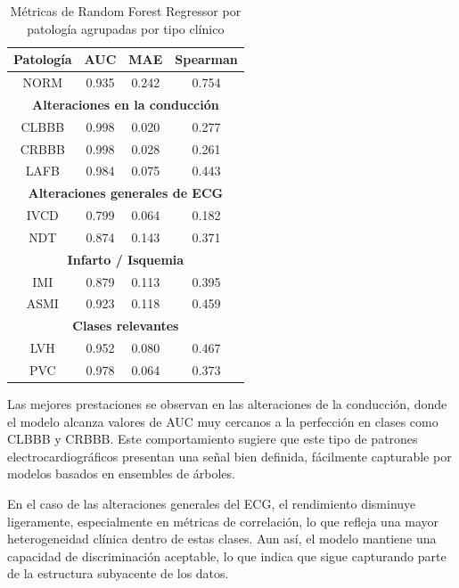 \documentclass[12pt,a4paper,twoside]{book}
\begin{document}
\begin{table}[H]
	\centering
	\begin{tabular}{|c|c|c|c|}
	\hline

	\textbf{Patología} & \textbf{AUC} & \textbf{MAE} & \textbf{Spearman} \\
	\hline
	NORM & 0.935 & 0.242 & 0.754 \\
	\hline

	\multicolumn{4}{|c|}{\textbf{Alteraciones en la conducción}} \\
	\hline
	CLBBB & 0.998 & 0.020 & 0.277 \\
	CRBBB & 0.998 & 0.028 & 0.261 \\
	LAFB  & 0.984 & 0.075 & 0.443 \\
	\hline

	\multicolumn{4}{|c|}{\textbf{Alteraciones generales de ECG}} \\
	\hline
	IVCD & 0.799 & 0.064 & 0.182 \\ 
	NDT  & 0.874 & 0.143 & 0.371 \\
	\hline

	\multicolumn{4}{|c|}{\textbf{Infarto / Isquemia}} \\
	\hline
	IMI  & 0.879 & 0.113 & 0.395 \\ 
	ASMI & 0.923 & 0.118 & 0.459 \\
	\hline


	\multicolumn{4}{|c|}{\textbf{Clases relevantes}} \\
	\hline
	LVH & 0.952 & 0.080 & 0.467 \\ 
	PVC & 0.978 & 0.064 & 0.373 \\
	\hline

	\end{tabular}
	\caption{Métricas de Random Forest Regressor por patología agrupadas por tipo clínico}
	\label{tab:metrics_grouped_rfr}
\end{table}

Las mejores prestaciones se observan en las alteraciones de la conducción, donde el modelo alcanza valores de AUC muy cercanos a la perfección en clases como CLBBB y CRBBB. 
Este comportamiento sugiere que este tipo de patrones electrocardiográficos presentan una señal bien definida, fácilmente capturable por modelos basados en ensembles de árboles.

En el caso de las alteraciones generales del ECG, el rendimiento disminuye ligeramente, especialmente en métricas de correlación, lo que refleja una mayor heterogeneidad clínica dentro de estas clases. 
Aun así, el modelo mantiene una capacidad de discriminación aceptable, lo que indica que sigue capturando parte de la estructura subyacente de los datos.
\end{document}
